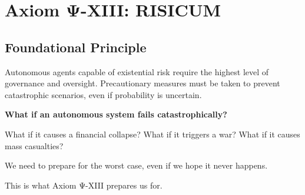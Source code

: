 

\chapter{Axiom Ψ-XIII: RISICUM}
\label{ch:axiom-XIII}

\section*{Foundational Principle}

\begin{principlebox}
Autonomous agents capable of existential risk require the highest level of governance and oversight. Precautionary measures must be taken to prevent catastrophic scenarios, even if probability is uncertain.
\end{principlebox}

\vspace{0.5cm}

\begin{tcolorbox}[colback=lightgray, colframe=legislativeblue, title=\textbf{📖 Why This Axiom Matters}]
\textbf{What if an autonomous system fails catastrophically?}

What if it causes a financial collapse? What if it triggers a war? What if it causes mass casualties?

We need to prepare for the worst case, even if we hope it never happens.

This is what Axiom Ψ-XIII prepares us for.
\end{tcolorbox}

\vspace{0.5cm}

